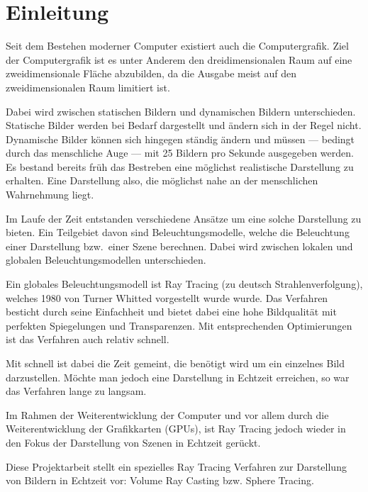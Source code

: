 
\chapter{Einleitung}
\label{chap:10_introduction}

Seit dem Bestehen moderner Computer existiert auch die Computergrafik. Ziel der Computergrafik ist es unter Anderem den dreidimensionalen Raum auf eine zweidimensionale Fläche abzubilden, da die Ausgabe meist auf den zweidimensionalen Raum limitiert ist.

Dabei wird zwischen statischen Bildern und dynamischen Bildern unterschieden. Statische Bilder werden bei Bedarf dargestellt und ändern sich in der Regel nicht. Dynamische Bilder können sich hingegen ständig ändern und müssen --- bedingt durch das menschliche Auge --- mit 25 Bildern pro Sekunde ausgegeben werden. Es bestand bereits früh das Bestreben eine möglichst realistische Darstellung zu erhalten. Eine Darstellung also, die möglichst nahe an der menschlichen Wahrnehmung liegt.

Im Laufe der Zeit entstanden verschiedene Ansätze um eine solche Darstellung zu bieten. Ein Teilgebiet davon sind Beleuchtungsmodelle, welche die Beleuchtung einer Darstellung bzw.\ einer Szene berechnen. Dabei wird zwischen lokalen und globalen Beleuchtungsmodellen unterschieden.

Ein globales Beleuchtungsmodell ist Ray Tracing (zu deutsch Strahlenverfolgung), welches 1980 von Turner Whitted vorgestellt wurde wurde. Das Verfahren besticht durch seine Einfachheit und bietet dabei eine hohe Bildqualität mit perfekten Spiegelungen und Transparenzen. Mit entsprechenden Optimierungen ist das Verfahren auch relativ schnell.

Mit schnell ist dabei die Zeit gemeint, die benötigt wird um ein einzelnes Bild darzustellen. Möchte man jedoch eine Darstellung in Echtzeit erreichen, so war das Verfahren lange zu langsam.

Im Rahmen der Weiterentwicklung der Computer und vor allem durch die Weiterentwicklung der Grafikkarten (GPUs), ist Ray Tracing jedoch wieder in den Fokus der Darstellung von Szenen in Echtzeit gerückt.

Diese Projektarbeit stellt ein spezielles Ray Tracing Verfahren zur Darstellung von Bildern in Echtzeit vor: Volume Ray Casting bzw. Sphere Tracing.
